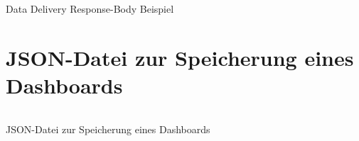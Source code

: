 \begin{listing}[h]
    \inputminted{jsx}{snippets/json/data-delivery-example/response.data-delivery.json}
    \caption{Data Delivery Response-Body Beispiel}
    \label{lst:datadeliveryresponsebodybeispiel}
\end{listing}

\newpage

\section*{JSON-Datei zur Speicherung eines Dashboards}
\label{sec:jsondateizurspeicherungeinesdashboards}

\begin{listing}[h]
    \inputminted{jsx}{snippets/json/dashboard-arrangement/anordnung.json}
    \caption{JSON-Datei zur Speicherung eines Dashboards}
    \label{lst:jsondateizurspeicherungeinesdashboards}
\end{listing}
